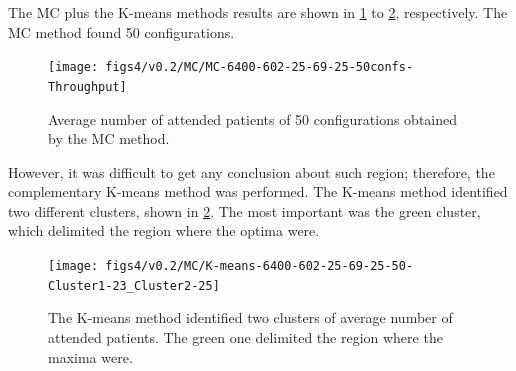 The MC plus the K-means methods results are shown in \ref{subfig:mc4-2}
to \ref{subfig:km4-2}, respectively. The MC method found 50 configurations.
\begin{figure}[H]
\centering{}\vspace*{-0.2cm}\texttt{[image: figs4/v0.2/MC/MC-6400-602-25-69-25-50confs-Throughput]}\caption{Average number of attended patients of 50 configurations obtained
by the MC method.\label{subfig:mc4-2}}
\end{figure}
However, it was difficult to get any conclusion about such region;
therefore, the complementary K-means method was performed. The K-means
method identified two different clusters, shown in \ref{subfig:km4-2}.
The most important was the green cluster, which delimited the region
where the optima were.
\begin{figure}[H]
\begin{centering}
\vspace*{-0.2cm}\texttt{[image: figs4/v0.2/MC/K-means-6400-602-25-69-25-50-Cluster1-23\_Cluster2-25]}
\par\end{centering}

\caption{The K-means method identified two clusters of average number of attended
patients. The green one delimited the region where the maxima were.\label{subfig:km4-2}}
\end{figure}

